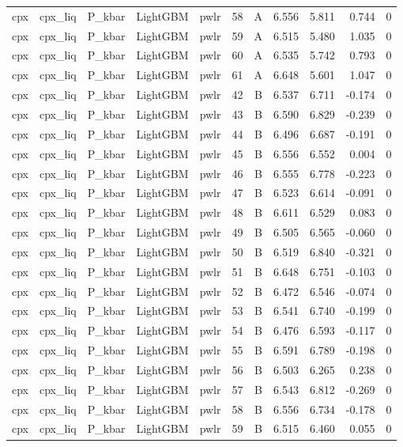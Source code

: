 \begin{longtable}{lllllrrrrrr}
cpx & cpx\_liq & P\_kbar & LightGBM & pwlr & 58 & A & 6.556 & 5.811 & 0.744 & 0 \\
cpx & cpx\_liq & P\_kbar & LightGBM & pwlr & 59 & A & 6.515 & 5.480 & 1.035 & 0 \\
cpx & cpx\_liq & P\_kbar & LightGBM & pwlr & 60 & A & 6.535 & 5.742 & 0.793 & 0 \\
cpx & cpx\_liq & P\_kbar & LightGBM & pwlr & 61 & A & 6.648 & 5.601 & 1.047 & 0 \\
cpx & cpx\_liq & P\_kbar & LightGBM & pwlr & 42 & B & 6.537 & 6.711 & -0.174 & 0 \\
cpx & cpx\_liq & P\_kbar & LightGBM & pwlr & 43 & B & 6.590 & 6.829 & -0.239 & 0 \\
cpx & cpx\_liq & P\_kbar & LightGBM & pwlr & 44 & B & 6.496 & 6.687 & -0.191 & 0 \\
cpx & cpx\_liq & P\_kbar & LightGBM & pwlr & 45 & B & 6.556 & 6.552 & 0.004 & 0 \\
cpx & cpx\_liq & P\_kbar & LightGBM & pwlr & 46 & B & 6.555 & 6.778 & -0.223 & 0 \\
cpx & cpx\_liq & P\_kbar & LightGBM & pwlr & 47 & B & 6.523 & 6.614 & -0.091 & 0 \\
cpx & cpx\_liq & P\_kbar & LightGBM & pwlr & 48 & B & 6.611 & 6.529 & 0.083 & 0 \\
cpx & cpx\_liq & P\_kbar & LightGBM & pwlr & 49 & B & 6.505 & 6.565 & -0.060 & 0 \\
cpx & cpx\_liq & P\_kbar & LightGBM & pwlr & 50 & B & 6.519 & 6.840 & -0.321 & 0 \\
cpx & cpx\_liq & P\_kbar & LightGBM & pwlr & 51 & B & 6.648 & 6.751 & -0.103 & 0 \\
cpx & cpx\_liq & P\_kbar & LightGBM & pwlr & 52 & B & 6.472 & 6.546 & -0.074 & 0 \\
cpx & cpx\_liq & P\_kbar & LightGBM & pwlr & 53 & B & 6.541 & 6.740 & -0.199 & 0 \\
cpx & cpx\_liq & P\_kbar & LightGBM & pwlr & 54 & B & 6.476 & 6.593 & -0.117 & 0 \\
cpx & cpx\_liq & P\_kbar & LightGBM & pwlr & 55 & B & 6.591 & 6.789 & -0.198 & 0 \\
cpx & cpx\_liq & P\_kbar & LightGBM & pwlr & 56 & B & 6.503 & 6.265 & 0.238 & 0 \\
cpx & cpx\_liq & P\_kbar & LightGBM & pwlr & 57 & B & 6.543 & 6.812 & -0.269 & 0 \\
cpx & cpx\_liq & P\_kbar & LightGBM & pwlr & 58 & B & 6.556 & 6.734 & -0.178 & 0 \\
cpx & cpx\_liq & P\_kbar & LightGBM & pwlr & 59 & B & 6.515 & 6.460 & 0.055 & 0 \\

\end{longtable}
